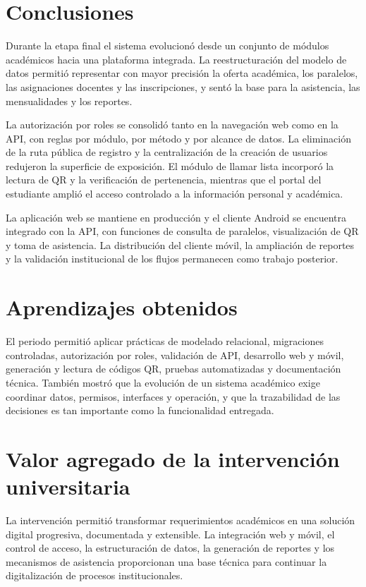 \documentclass[12pt,a4paper,oneside]{report}
\begin{document}
\section{Conclusiones}

Durante la etapa final el sistema evolucionó desde un conjunto de módulos académicos hacia una plataforma integrada. La reestructuración del modelo de datos permitió representar con mayor precisión la oferta académica, los paralelos, las asignaciones docentes y las inscripciones, y sentó la base para la asistencia, las mensualidades y los reportes.

La autorización por roles se consolidó tanto en la navegación web como en la API, con reglas por módulo, por método y por alcance de datos. La eliminación de la ruta pública de registro y la centralización de la creación de usuarios redujeron la superficie de exposición. El módulo de llamar lista incorporó la lectura de QR y la verificación de pertenencia, mientras que el portal del estudiante amplió el acceso controlado a la información personal y académica.

La aplicación web se mantiene en producción y el cliente Android se encuentra integrado con la API, con funciones de consulta de paralelos, visualización de QR y toma de asistencia. La distribución del cliente móvil, la ampliación de reportes y la validación institucional de los flujos permanecen como trabajo posterior.

\section{Aprendizajes obtenidos}

El periodo permitió aplicar prácticas de modelado relacional, migraciones controladas, autorización por roles, validación de API, desarrollo web y móvil, generación y lectura de códigos QR, pruebas automatizadas y documentación técnica. También mostró que la evolución de un sistema académico exige coordinar datos, permisos, interfaces y operación, y que la trazabilidad de las decisiones es tan importante como la funcionalidad entregada.

\section{Valor agregado de la intervención universitaria}

La intervención permitió transformar requerimientos académicos en una solución digital progresiva, documentada y extensible. La integración web y móvil, el control de acceso, la estructuración de datos, la generación de reportes y los mecanismos de asistencia proporcionan una base técnica para continuar la digitalización de procesos institucionales.
\end{document}
